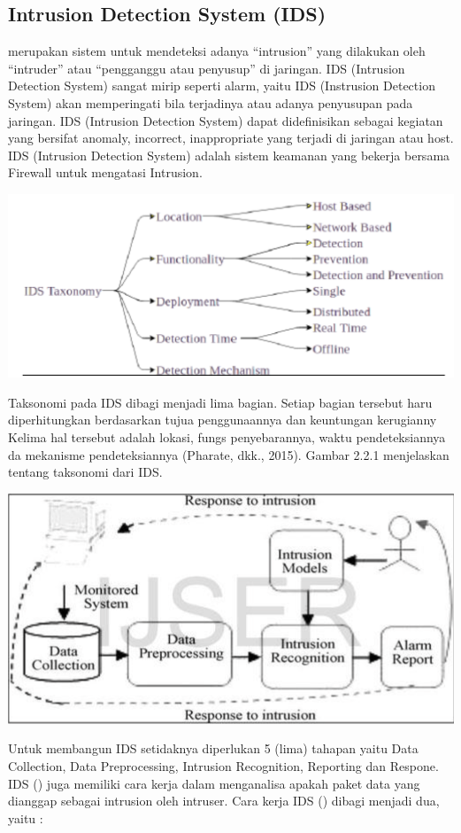\documentclass[conference]{IEEEtran}
\begin{document}
\subsection{Intrusion Detection System (IDS)}
merupakan sistem untuk mendeteksi adanya “intrusion” yang dilakukan oleh “intruder” atau “pengganggu atau penyusup” di jaringan. IDS (Intrusion Detection System) sangat mirip seperti alarm, yaitu IDS (Instrusion Detection System) akan memperingati bila terjadinya atau adanya penyusupan pada jaringan. IDS (Intrusion Detection System) dapat didefinisikan sebagai kegiatan yang bersifat anomaly, incorrect, inappropriate yang terjadi di jaringan atau host. IDS (Intrusion Detection System) adalah sistem keamanan yang bekerja bersama Firewall untuk mengatasi Intrusion.

\begin{center}
\includegraphics[width=.4\textwidth]{picture/Gambar 2.2.1.PNG}

\end{center}

Taksonomi pada IDS dibagi menjadi lima bagian. Setiap bagian tersebut haru diperhitungkan berdasarkan tujua penggunaannya dan keuntungan kerugianny Kelima hal tersebut adalah lokasi, fungs penyebarannya, waktu pendeteksiannya da mekanisme pendeteksiannya (Pharate, dkk., 2015). Gambar 2.2.1 menjelaskan tentang taksonomi dari IDS.

\begin{center}
\includegraphics[width=.4\textwidth]{picture/Gambar 2.2.2.PNG}
\end{center}

Untuk membangun IDS setidaknya diperlukan 5 (lima) tahapan yaitu Data Collection, Data Preprocessing, Intrusion Recognition, Reporting dan Respone. IDS () juga memiliki cara kerja dalam menganalisa apakah paket data yang dianggap sebagai intrusion oleh intruser. Cara kerja IDS () dibagi menjadi dua, yaitu :
\end{document}
